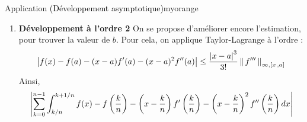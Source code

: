\begin{omed}{Application \textcolor{black}{(Développement asymptotique)}}{myorange}
\begin{enumerate}
\begin{align*}
                & \leq \sum_{k=0}^{n-1} \int_{k/n}^{k+1/n} \abs{f(x) - f\left(\frac{k}{n}\right) - \left(x - \frac{k}{n}\right) f'\left(\frac{k}{n}\right)} dx \\
                & \text{Taylor-Lagrange à l’ordre } \lilbox{myorange}{1} \\
                & \leq \sum_{k=0}^{n-1} \int_{k/n}^{k+1/n} \frac{\left(x - \frac{k}{n}\right)^2}{2} \nnorm{\infty,\intervalleFF{0}{1}}{f''} \\
                &= \sum_{k=0}^{n-1} \frac{\nnorm{\infty,\intervalleFF{0}{1}}{f''}}{n^3} \\
                &= \frac{\nnorm{\infty,\intervalleFF{0}{1}}{f''}}{n^2} \\
                \textit{i.e. } \abs{\int_{0}^{1} f(x)dx - \frac{1}{n} \sum_{k=0}^{n-1} f\left(\frac{k}{n}\right) - \frac{1}{2n^2} \sum_{k=0}^{n-1}f'\left(\frac{k}{n}\right)} &\leq  \frac{\nnorm{\infty,\intervalleFF{0}{1}}{f''}}{n^2} 
            \end{align*}
            Or, $\frac{1}{2n^2} \sum_{k=0}^{n-1}f'\left(\frac{k}{n}\right) = \frac{1}{2n} \left(\frac{1}{n} \sum_{k=0}^{n-1} f'\left(\frac{k}{n}\right)\right) \limi{n}{+\infty} \left(\int_{0}^{1} f'(x)dx + \comp{\mathcal{O}}{n}{+\infty}{\frac{1}{n}} \right)$ d’après le développement à l’ordre $0$. Finalement 
            \begin{align*}
                \abs{\int_{0}^{1} f(x)dx - \frac{1}{n} \sum_{k=0}^{n-1} f\left(\frac{k}{n}\right) - \frac{1}{2n} \left( f(1) - f(0) + \comp{\mathcal{O}}{n}{+\infty}{\frac{1}{n}} \right)}  &\leq  \frac{\nnorm{\infty,\intervalleFF{0}{1}}{f''}}{n^2} \\
                \text{D’où} \quad \lilbox{myorange}{$\int_{0}^{1} f(x)dx - \frac{1}{n} \sum_{k=0}^{n-1} f\left(\frac{k}{n}\right) = \frac{f(1) - f(0)}{2n} + \comp{\mathcal{O}}{n}{+\infty}{\frac{1}{n^2}}$}
            \end{align*}
            \item \textbf{Développement à l’ordre 2} \quad On se propose d’améliorer encore l’estimation, pour trouver la valeur de $b$. Pour cela, on applique Taylor-Lagrange à l’ordre  :
            \[ \abs{f(x) - f(a) - (x-a) f'(a) - (x-a)^2 f''(a)} \leq \frac{\abs{x -a}^3}{3!} \nnorm{\infty, \intervalleFF{x}{a}}{f'''} \]
            Ainsi, 
            \begin{align*}
                &\abs{\sum_{k=0}^{n-1} \int_{k/n}^{k+1/n} f(x) - f\left(\frac{k}{n}\right) - \left(x - \frac{k}{n}\right) f'\left(\frac{k}{n}\right) - \left(x - \frac{k}{n}\right)^2 f''\left(\frac{k}{n}\right) dx} \\

\end{align*}
\end{enumerate}
\end{omed}
